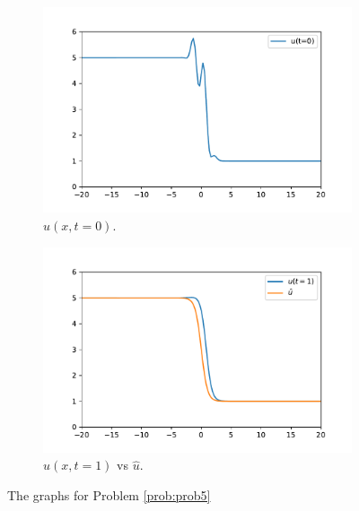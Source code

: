 \begin{problem}
\begin{figure}[H]
\centering
\begin{subfigure}{.49\textwidth}
\centering
\includegraphics[width=\linewidth]{prob5_initial.pdf}
\caption{$u(x,t=0)$.}
\end{subfigure}
%
\begin{subfigure}{.49\textwidth}
\centering
\includegraphics[width=\linewidth]{prob5_ufinal_utilda.pdf}
\caption{$u(x,t = 1)$ vs $\hat{u}$.}
\end{subfigure}
\caption{The graphs for Problem \ref{prob:prob5}}
\label{fig:prob5}
\end{figure}
\end{problem}